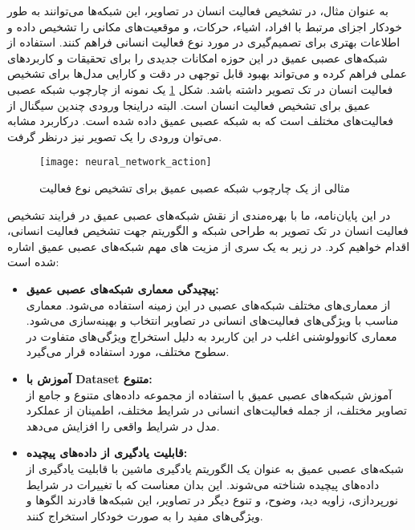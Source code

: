 به عنوان مثال، در تشخیص فعالیت انسان در تصاویر، این شبکه‌ها می‌توانند به طور خودکار اجزای مرتبط با افراد، اشیاء، حرکات، و موقعیت‌های مکانی را تشخیص داده و اطلاعات بهتری برای تصمیم‌گیری در مورد نوع فعالیت انسانی فراهم کنند.
استفاده از شبکه‌های عصبی عمیق در این حوزه امکانات جدیدی را برای تحقیقات و کاربردهای عملی فراهم کرده و می‌تواند بهبود قابل توجهی در دقت و کارایی مدل‌ها برای تشخیص فعالیت انسان در تک تصویر داشته باشد. شکل %
\ref{fig:neural_network_action_first}
یک نمونه از چارچوب شبکه عصبی عمیق برای تشخیص فعالیت انسان است. البته دراینجا ورودی چندین سیگنال از فعالیت‌های مختلف است که به شبکه عصبی عمیق داده شده است. درکاربرد مشابه می‌توان ورودی را یک تصویر نیز درنظر گرفت.
\begin{figure}[ht]
	\centerline{\texttt{[image: neural\_network\_action]}}
	\caption[مثالی از یک چارچوب شبکه عصبی عمیق برای تشخیص نوع فعالیت]{
		مثالی از یک چارچوب شبکه عصبی عمیق برای تشخیص نوع فعالیت
		\cite{WinNT}
	}
	\label{fig:neural_network_action_first}
\end{figure}

در این پایان‌نامه، ما با بهره‌مندی از نقش شبکه‌های عصبی عمیق در فرایند تشخیص فعالیت انسان در تک تصویر به طراحی شبکه و الگوریتم جهت تشخیص فعالیت انسانی، اقدام خواهیم کرد. در زیر به یک سری از مزیت های مهم شبکه‌های عصبی عمیق اشاره شده است:
\begin{itemize}
	\item \textbf{پیچیدگی معماری شبکه‌های عصبی عمیق:}\\
از معماری‌های مختلف شبکه‌های عصبی در این زمینه استفاده می‌شود. معماری مناسب با ویژگی‌های فعالیت‌های انسانی در تصاویر انتخاب و بهینه‌سازی می‌شود. معماری کانوولوشنی%
اغلب در این کاربرد به دلیل استخراج ویژگی‌های متفاوت در سطوح مختلف، مورد استفاده قرار می‌گیرد. 

	\item \textbf{آموزش با %
		\gls{Dataset}
		 متنوع:}\\
آموزش شبکه‌های عصبی عمیق با استفاده از مجموعه داده‌های متنوع و جامع از تصاویر مختلف، از جمله فعالیت‌های انسانی در شرایط مختلف، اطمینان از عملکرد مدل در شرایط واقعی را افزایش می‌دهد.

\item \textbf{قابلیت یادگیری از داده‌های پیچیده:}\\
شبکه‌های عصبی عمیق به عنوان یک الگوریتم یادگیری ماشین با قابلیت یادگیری از داده‌های پیچیده شناخته می‌شوند. این بدان معناست که با تغییرات در شرایط نورپردازی، زاویه دید، وضوح، و تنوع دیگر در تصاویر، این شبکه‌ها قادرند الگوها و ویژگی‌های مفید را به صورت خودکار استخراج کنند.
\end{itemize}

